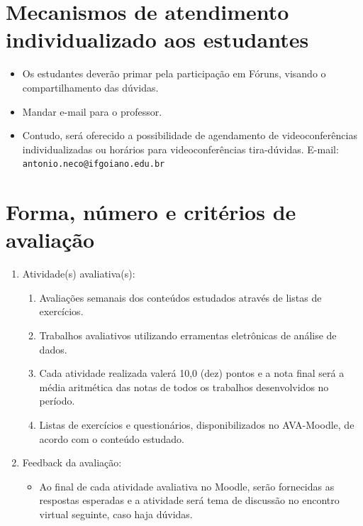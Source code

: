 \documentclass[
]{book}
\providecommand{\tightlist}{%
  \setlength{\itemsep}{0pt}\setlength{\parskip}{0pt}}
\begin{document}
\hypertarget{mecanismos-de-atendimento-individualizado-aos-estudantes}{%
\section*{Mecanismos de atendimento individualizado aos estudantes}\label{mecanismos-de-atendimento-individualizado-aos-estudantes}}

\begin{itemize}
\tightlist
\item
  Os estudantes deverão primar pela participação em Fóruns, visando o compartilhamento das dúvidas.
\item
  Mandar e-mail para o professor.
\item
  Contudo, será oferecido a possibilidade de agendamento de videoconferências individualizadas ou horários para videoconferências tira-dúvidas.
  E-mail: \texttt{antonio.neco@ifgoiano.edu.br}
\end{itemize}

\hypertarget{forma-nuxfamero-e-crituxe9rios-de-avaliauxe7uxe3o}{%
\section*{Forma, número e critérios de avaliação}\label{forma-nuxfamero-e-crituxe9rios-de-avaliauxe7uxe3o}}

\begin{enumerate}
\def\labelenumi{\arabic{enumi})}
\item
  Atividade(s) avaliativa(s):

  \begin{enumerate}
  \def\labelenumii{\arabic{enumii}.}
  \tightlist
  \item
    Avaliações semanais dos conteúdos estudados através de listas de exercícios.
  \item
    Trabalhos avaliativos utilizando erramentas eletrônicas de análise de dados.
  \item
    Cada atividade realizada valerá 10,0 (dez) pontos e a nota final será a média aritmética das notas de todos os trabalhos desenvolvidos no período.
  \item
    Listas de exercícios e questionários, disponibilizados no AVA-Moodle, de acordo com o conteúdo estudado.
  \end{enumerate}
\item
  Feedback da avaliação:

  \begin{itemize}
  \tightlist
  \item
    Ao final de cada atividade avaliativa no Moodle, serão fornecidas as respostas esperadas e a atividade será tema de discussão no encontro virtual seguinte, caso haja dúvidas.
  \end{itemize}
\end{enumerate}
\end{document}
